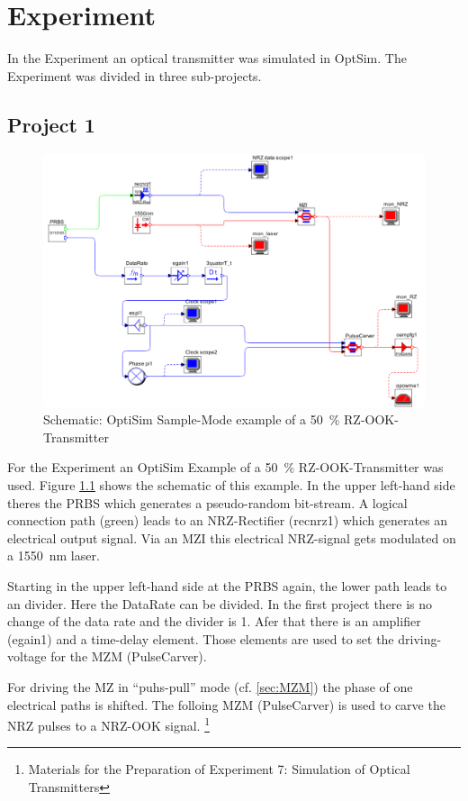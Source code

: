 \chapter{Experiment}
\label{ch:experiment}

In the Experiment an optical transmitter was simulated in OptSim. The Experiment was divided in three sub-projects.

\section{Project 1}
\label{sec:P1}

\begin{figure}[h]%
\includegraphics[width=.8\columnwidth]{Grafiken/P1_aufbau.jpg}%
\caption{Schematic: OptiSim Sample-Mode example of a 50~\% RZ-OOK-Transmitter}%
\label{fig:P1_aufbau}%
\end{figure}

For the Experiment an OptiSim Example of a 50~\% RZ-OOK-Transmitter was used. Figure \ref{fig:P1_aufbau} shows the schematic of this example\footnotemark[3]. In the upper left-hand side theres the PRBS which generates a pseudo-random bit-stream. A logical connection path (green) leads to an NRZ-Rectifier (recnrz1) which generates an electrical output signal. Via an MZI this electrical NRZ-signal gets modulated on a 1550~nm laser. 

Starting in the upper left-hand side at the PRBS again, the lower path leads to an divider. Here the DataRate can be divided. In the first project there is no change of the data rate and the divider is 1. Afer that there is an amplifier (egain1) and a time-delay element. Those elements are used to set the driving-voltage for the MZM (PulseCarver).

For driving the MZ in "`puhs-pull"' mode (cf. \ref{sec:MZM}) the phase of one electrical paths is shifted. The folloing MZM (PulseCarver) is used to carve the NRZ pulses to a NRZ-OOK signal. \footnote[3]{Materials for the Preparation of Experiment 7: Simulation of Optical Transmitters}

